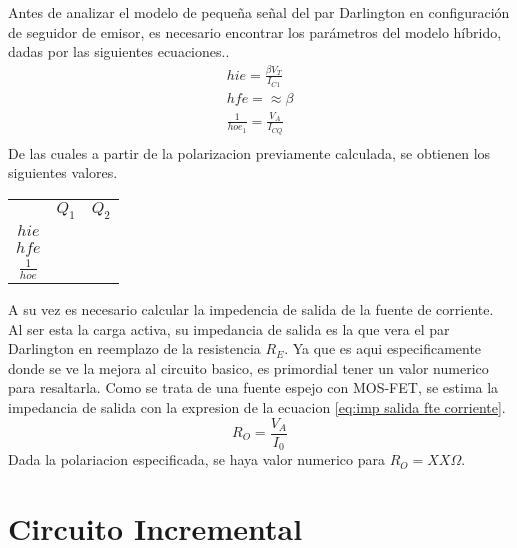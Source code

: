 Antes de analizar el modelo de pequeña señal del par Darlington en configuración de seguidor de emisor, es necesario encontrar los parámetros del modelo híbrido, dadas por las siguientes ecuaciones..
\begin{align}
    hie = \frac{\beta V_T}{I_{C1}} \\
    hfe = \approx \beta \\
    \frac{1}{hoe_1} = \frac{V_{A}}{I_{CQ}} \\
\end{align}
De las cuales a partir de la polarizacion previamente calculada, se obtienen los siguientes valores.

\begin{table}
    \centering
    \begin{tabular}{|c|c|c|}
     & $Q_1$ & $Q_2$ \\
    $hie$           &    &     \\
    $hfe$           &    &      \\
    $\frac{1}{hoe}$ &    &      \\
    \end{tabular}
\end{table}



A su vez es necesario calcular la impedencia de salida de la fuente de corriente. Al ser esta la carga activa, su impedancia de salida es la que vera el par Darlington en reemplazo de la resistencia $R_E$.
Ya que es aqui especificamente donde se ve la mejora al circuito basico, es primordial tener un valor numerico para resaltarla. Como se trata de una fuente espejo con MOS-FET, se estima la impedancia de salida con la expresion de la ecuacion \ref{eq:imp salida fte corriente}.
\begin{equation}
    R_O = \frac{V_A}{I_0} 
    \label{eq:imp salida fte corriente}
\end{equation}
Dada la polariacion especificada, se haya valor numerico para $R_O =XX \Omega$.

\section{Circuito Incremental}

